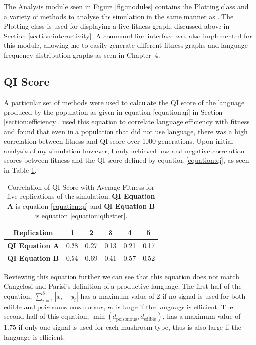 \documentclass[12pt,a4paper]{report}
\begin{document}
The Analysis module seen in Figure \ref{fig:modules} contains the Plotting class and a variety of methods to analyse the simulation in the same manner as \citet{Cangelosi1998}. The Plotting class is used for displaying a live fitness graph, discussed above in Section \ref{section:interactivity}. A command-line interface was also implemented for this module, allowing me to easily generate different fitness graphs and language frequency distribution graphs as seen in Chapter~4.

\subsection{QI Score}

A particular set of methods were used to calculate the QI score of the language produced by the population as given in equation \ref{equation:qi} in Section \ref{section:efficiency}. \citet{Cangelosi1998} used this equation to correlate language efficiency with fitness and found that even in a population that did not use language, there was a high correlation between fitness and QI score over 1000 generations. Upon initial analysis of my simulation however, I only achieved low and negative correlation scores between fitness and the QI score defined by equation \ref{equation:qi}, as seen in Table \ref{table:qi-correlation}.

\begin{table}[t]
\centering
 \begin{tabular}{ c || c | c | c | c | c}
 \bf{Replication} & \bf{1} & \bf{2} & \bf{3} & \bf{4} & \bf{5}\\
 \hline
  \hline
\bf {QI Equation A} & 0.28 & 0.27 & 0.13 & 0.21 & 0.17 \\
 \hline
\bf {QI Equation B} & 0.54 & 0.69 & 0.41 & 0.57 & 0.52 \\
\end{tabular}
\caption{Correlation of QI Score with Average Fitness for five replications of the simulation. {\bf QI Equation A} is equation \ref{equation:qi} and {\bf QI Equation B} is equation \ref{equation:qibetter}.}
\label{table:qi-correlation}
\end{table}

Reviewing this equation further we can see that this equation does not match Cangelosi and Parisi's  definition of a productive language. The first half of the equation, $\sum^{8}_{i = 1} |x_i - y_i|$ has a maximum value of 2 if no signal is used for both edible and poisonous mushrooms, so is large if the language is efficient. The second half of this equation, $\min (d_{\mathrm{poisonous}}, d_{\mathrm{edible}})$, has a maximum value of 1.75 if only one signal is used for each mushroom type, thus is also large if the language is efficient. 
\end{document}
